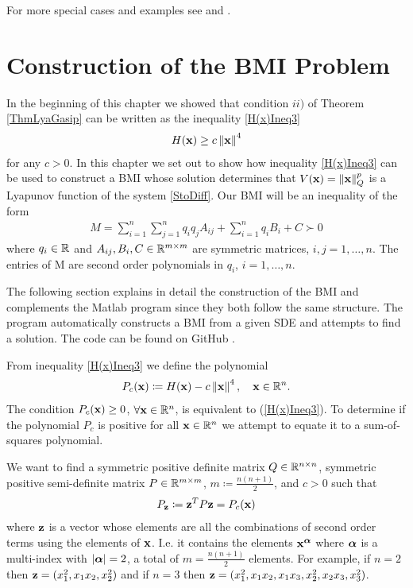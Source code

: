 \documentclass[a4paper,12pt,twoside,BCOR=10mm]{scrbook}
\begin{document}
For more special cases and examples see \citep{HGGS2018localLya} and \citep{sdestab2012khaminskii}.

\section{Construction of the BMI Problem}\label{SectionConstrBMIProblem}
In the beginning of this chapter we showed that condition $ii)$ of Theorem \ref{ThmLyaGasip} can be written as the inequality \eqref{H(x)Ineq3}
\begin{align*}
    H(\mathbf{x}) \geq c\left\lVert\mathbf{x}\right\rVert^4
\end{align*}
for any $c > 0$.
In this chapter we set out to show how inequality \eqref{H(x)Ineq3} can be used to construct a BMI whose solution determines that $V(\mathbf{x}) = \left\lVert\mathbf{x}\right\rVert_Q^p$ is a Lyapunov function of the system \eqref{StoDiff}. Our BMI will be an inequality of the form
\begin{align*}
    M = \sum_{i = 1}^n \sum_{j = 1}^n q_iq_j A_{ij} + \sum_{i = 1}^n q_i B_i + C \succ 0
\end{align*}
where $q_i \in \mathbb{R}^{}$ and $A_{ij}, B_i, C \in \mathbb{R}^{m \times m}$ are symmetric matrices, $i,j = 1, \ldots, n$. The entries of M are second order polynomials in $q_i$, $i = 1, \ldots, n$.

The following section explains in detail the construction of the BMI and complements the Matlab program since they both follow the same structure. The program automatically constructs a BMI from a given SDE and attempts to find a solution. The code can be found on GitHub \citep{Mverk2022}.

From inequality \eqref{H(x)Ineq3} we define the polynomial
\begin{align}\label{P_c definition}
    P_c(\mathbf{x}) \coloneqq H(\mathbf{x}) - c\left\lVert\mathbf{x}\right\rVert_{}^{4}, \quad \mathbf{x}\in \mathbb{R}^{n}.
\end{align}
The condition $P_c(\mathbf{x}) \geq 0$, $\forall \mathbf{x} \in \mathbb{R}^{n}$, is equivalent to (\ref{H(x)Ineq3}). To determine if the polynomial $P_c$ is positive for all $\mathbf{x} \in \mathbb{R}^{n}$ we attempt to equate it to a sum-of-squares polynomial.

We want to find a symmetric positive definite matrix $Q\in \mathbb{R}^{n\times n}$, symmetric positive semi-definite matrix $P \in \mathbb{R}^{m \times m}$, $m \coloneqq \frac{n(n + 1)}{2}$, and $c > 0$ such that
\begin{align}\label{P_Z definition}
    P_{\mathbf{z}} \coloneqq \mathbf{z}^T P \mathbf{z} = P_c(\mathbf{x})
\end{align}
where $\mathbf{z}$ is a vector whose elements are all the combinations of second order terms using the elements of $\mathbf{x}$. I.e. it contains the elements $\mathbf{x}^{\bm{\alpha}}$ where $\bm{\alpha}$ is a multi-index with $|\bm{\alpha}| = 2$, a total of $m = \frac{n(n + 1)}{2}$ elements. For example, if $n = 2$ then $\mathbf{z} = (x_1^2, x_1x_2, x_2^2)$ and if $n = 3$ then $\mathbf{z} = (x_1^2, x_1x_2, x_1x_3, x_2^2, x_2x_3, x_3^2)$.
\end{document}
